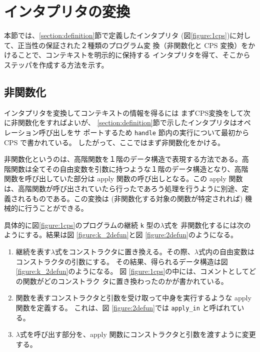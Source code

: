 \section{インタプリタの変換}
\label{section:transform}

本節では、\ref{section:definition}節で定義したインタプリタ
(図\ref{figure:1cps})に対して、正当性の保証された２種類のプログラム変
換（非関数化と CPS 変換）をかけることで、コンテキストを明示的に保持する
インタプリタを得て、そこからステッパを作成する方法を示す。

\subsection{非関数化}
\label{section:2defun}

インタプリタを変換してコンテキストの情報を得るには
まずCPS変換をして次に非関数化をすればよいが、
\ref{section:definition}節で示したインタプリタはオペレーション呼び出しをサ
ポートするため \texttt{handle} 節内の実行について最初から CPS で書かれている。
したがって、ここではまず非関数化をかける。

非関数化というのは、高階関数を１階のデータ構造で表現する方法である。高
階関数は全てその自由変数を引数に持つような１階のデータ構造となり、高階
関数を呼び出していた部分は apply 関数の呼び出しとなる。この apply 関数
は、高階関数が呼び出されていたら行ったであろう処理を行うように別途、定
義されるものである。この変換は
(非関数化する対象の関数が特定されれば)
機械的に行うことができる。

具体的に図\ref{figure:1cps}のプログラムの継続 \texttt{k} 型の$\lambda$式を
非関数化するには次のようにする。結果は図 \ref{figure:k_2defun}と図 \ref{figure:2defun}のようになる。

\begin{enumerate}
\item 継続を表す$\lambda$式をコンストラクタに置き換える。その際、$\lambda$式内の自由変数はコンストラクタの引数にする。
その結果、得られるデータ構造は図 \ref{figure:k_2defun}のようになる。
図 \ref{figure:1cps}の中には、コメントとしてどの関数がどのコンストラク
タに置き換わったのかが書かれている。
\item 関数を表すコンストラクタと引数を受け取って中身を実行するような apply 関数を定義する。
これは、図 \ref{figure:2defun}では \texttt{apply\_in} と呼ばれている。
\item $\lambda$式を呼び出す部分を、apply 関数にコンストラクタと引数を渡すように変更する。
\end{enumerate}

